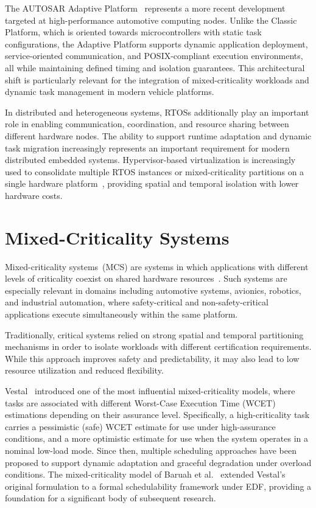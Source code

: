 The AUTOSAR Adaptive Platform~\cite{autosar2023} represents a
more recent development targeted at high-performance
automotive computing nodes. Unlike the Classic Platform, which
is oriented towards microcontrollers with static task
configurations, the Adaptive Platform supports dynamic
application deployment, service-oriented communication, and
POSIX-compliant execution environments, all while maintaining
defined timing and isolation guarantees. This architectural
shift is particularly relevant for the integration of
mixed-criticality workloads and dynamic task management in
modern vehicle platforms.

In distributed and heterogeneous systems, RTOSs additionally
play an important role in enabling communication, coordination,
and resource sharing between different hardware nodes. The
ability to support runtime adaptation and dynamic task
migration increasingly represents an important requirement for
modern distributed embedded systems. Hypervisor-based
virtualization is increasingly used to consolidate multiple
RTOS instances or mixed-criticality partitions on a single
hardware platform~\cite{heiser2020}, providing spatial and
temporal isolation with lower hardware costs.

\section{Mixed-Criticality Systems}
\label{sec:mcs}

Mixed-criticality systems~(MCS) are systems in which
applications with different levels of criticality coexist on
shared hardware resources~\cite{vestal2007,burns2017}. Such
systems are especially relevant in domains including
automotive systems, avionics, robotics, and industrial
automation, where safety-critical and non-safety-critical
applications execute simultaneously within the same platform.

Traditionally, critical systems relied on strong spatial and
temporal partitioning mechanisms in order to isolate workloads
with different certification requirements. While this approach
improves safety and predictability, it may also lead to low
resource utilization and reduced flexibility.

Vestal~\cite{vestal2007} introduced one of the most influential
mixed-criticality models, where tasks are associated with
different Worst-Case Execution Time (WCET) estimations
depending on their assurance level. Specifically, a
high-criticality task carries a pessimistic (safe) WCET
estimate for use under high-assurance conditions, and a
more optimistic estimate for use when the system operates
in a nominal low-load mode. Since then, multiple scheduling
approaches have been proposed to support dynamic adaptation
and graceful degradation under overload conditions. The
mixed-criticality model of Baruah et al.~\cite{baruah2011}
extended Vestal's original formulation to a formal
schedulability framework under EDF, providing a foundation
for a significant body of subsequent research.

